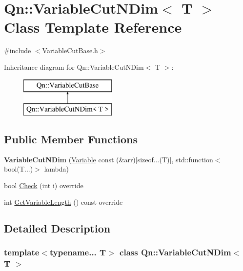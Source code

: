 \hypertarget{classQn_1_1VariableCutNDim}{}\section{Qn\+:\+:Variable\+Cut\+N\+Dim$<$ T $>$ Class Template Reference}
\label{classQn_1_1VariableCutNDim}


{\ttfamily \#include $<$Variable\+Cut\+Base.\+h$>$}

Inheritance diagram for Qn\+:\+:Variable\+Cut\+N\+Dim$<$ T $>$\+:\begin{figure}[H]
\begin{center}
\leavevmode
\includegraphics[height=2.000000cm]{classQn_1_1VariableCutNDim}
\end{center}
\end{figure}
\subsection*{Public Member Functions}
\begin{DoxyCompactItemize}
\item 
\mbox{\label{classQn_1_1VariableCutNDim_ae6f4f4bad96a292c2e83e97751e5e64d}} 
{\bfseries Variable\+Cut\+N\+Dim} (\mbox{\hyperlink{classQn_1_1Variable}{Variable}} const (\&arr)\mbox{[}sizeof...(T)\mbox{]}, std\+::function$<$ bool(T...)$>$ lambda)
\item 
bool \mbox{\hyperlink{classQn_1_1VariableCutNDim_a572a7d7e846d4b16a4dcacf138056347}{Check}} (int i) override
\item 
int \mbox{\hyperlink{classQn_1_1VariableCutNDim_a623c598922f52c0b459f43981a9d2636}{Get\+Variable\+Length}} () const override
\end{DoxyCompactItemize}


\subsection{Detailed Description}
\subsubsection*{template$<$typename... T$>$\newline
class Qn\+::\+Variable\+Cut\+N\+Dim$<$ T $>$}

